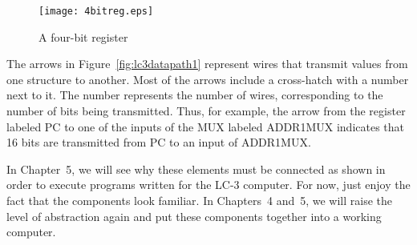 \documentclass{patt}
\begin{document}
\begin{figure}
\centerline{\texttt{[image: 4bitreg.eps]}}
\caption{A four-bit register}
\label{fig:4reg}
\vspace{12pt}
\end{figure}

The arrows in Figure~\ref{fig:lc3datapath1} represent wires that transmit 
values from one structure to another.  Most of the arrows include a 
cross-hatch with a number next to it.  The number represents the number of 
wires, corresponding to the number of bits being transmitted.  Thus, 
for example, the arrow from the register labeled PC to one of the inputs of 
the MUX labeled ADDR1MUX 
indicates that 16 bits are transmitted from PC to an input of ADDR1MUX.

In Chapter~5, we will see why these elements must be connected as
shown in order to execute programs written for the LC-3 computer.
For now, just enjoy the fact that the components look familiar.  In
Chapters~4 and~5, we will raise the level of abstraction again and put
these components together into a working computer.

\FloatBarrier
\end{document}
